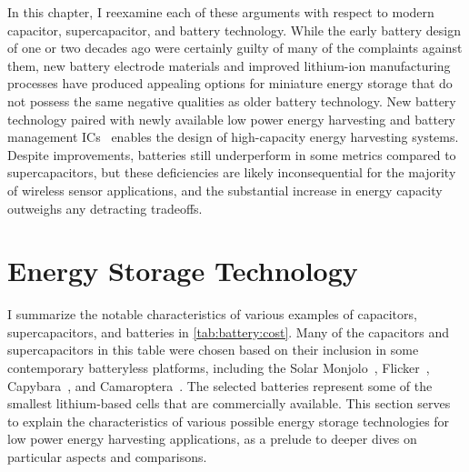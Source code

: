 In this chapter, I reexamine each of these arguments with respect to modern capacitor, supercapacitor, and battery technology. 
While the early battery design of one or two decades ago were certainly guilty of many of the complaints against them, new 
battery electrode materials and improved lithium-ion manufacturing processes have produced appealing options for miniature energy storage 
that do not possess the same negative qualities as older battery technology. 
New battery technology paired with newly available low power energy harvesting and battery management ICs~\cite{bq25505,adp5091} enables the design of high-capacity energy harvesting systems.
Despite improvements, batteries still underperform in some metrics compared to supercapacitors, but these deficiencies are likely inconsequential for the majority of wireless sensor applications, and the substantial increase in energy capacity outweighs any detracting tradeoffs.\\

\begin{landscape}
\end{landscape}

\section{Energy Storage Technology}
\label{sec:battery-new}

I summarize the notable characteristics of various examples of capacitors, supercapacitors, and batteries in \cref{tab:battery:cost}. Many of the capacitors and supercapacitors in this table were chosen based on their inclusion in some contemporary batteryless platforms, including the Solar Monjolo~\cite{campbellEnergy14}, Flicker~\cite{hesterFlicker17}, Capybara~\cite{colinReconfigurable18}, and Camaroptera~\cite{nardello2019camaroptera}.
The selected batteries represent some of the smallest lithium-based cells that are commercially available. 
This section serves to explain the characteristics of various possible energy storage technologies for low power energy harvesting applications, as a prelude to deeper dives on particular aspects and comparisons.

